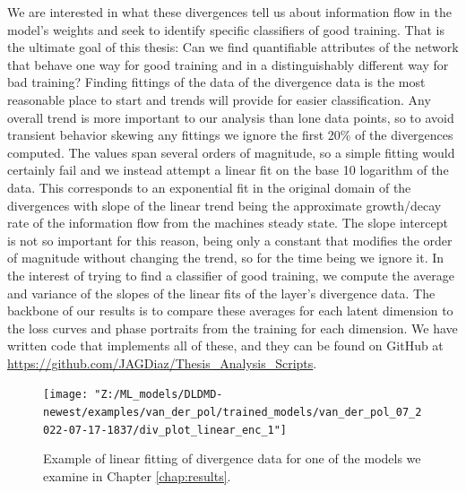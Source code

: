 We are interested in what these divergences tell us about information flow in the model's weights and 
seek to identify specific classifiers of good training. That is the ultimate goal of this thesis: 
Can we find quantifiable attributes of the network that behave one way for good training and in a 
distinguishably different way for bad training? Finding fittings of the data of the divergence data
is the most reasonable place to start and trends will provide for easier classification. Any overall trend
is more important to our analysis than lone data points, so to avoid transient behavior skewing any fittings
we ignore the first 20\% of the divergences computed. The values span several orders of magnitude, so a simple 
fitting would certainly fail and we instead attempt a linear fit on the base 10 logarithm of the data. This 
corresponds to an exponential fit in the original domain of the divergences with slope of the linear trend 
being the approximate growth/decay rate of the information flow from the machines steady state. The slope 
intercept is not so important for this reason, being only a constant that modifies the order of magnitude 
without changing the trend, so for the time being we ignore it. In the interest of trying to find a 
classifier of good training, we compute the average and variance of the slopes of the linear fits of 
the layer's divergence data. The backbone of our results is to compare these averages for each latent 
dimension to the loss curves and phase portraits from the training for each dimension.
We have written code that implements all of these, and they can be found on GitHub at
\href{https://github.com/JAGDiaz/Thesis_Analysis_Scripts}{https://github.com/JAGDiaz/Thesis\_Analysis\_Scripts}.

\begin{figure}[hbt!]
    \centering
    \begin{minipage}{\textwidth}
        \texttt{[image: "Z:/ML\_models/DLDMD-newest/examples/van\_der\_pol/trained\_models/van\_der\_pol\_07\_2022-07-17-1837/div\_plot\_linear\_enc\_1"]}
    \end{minipage}
    \caption{Example of linear fitting of divergence data for one of the models we examine in Chapter
    \ref{chap:results}.}
    \label{fig:divergence of model example}
\end{figure}


